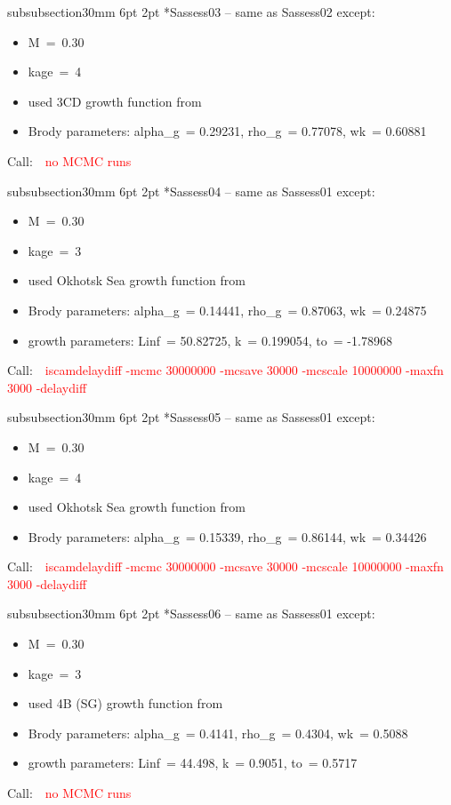 \documentclass[11pt]{book}
\makeatletter
\newcommand{\red}[1]{{\textcolor{red} {#1}}}
\renewcommand{\subsubsection}{\@startsection%
{subsubsection}{3}{0mm}%
{6pt \@plus -0pt \@minus -0pt}{2pt \@plus 0pt}%
{\normalfont\bf}}%
\newcommand\call[1]{
\footnotesize\selectfont\hangindent=0.35in
Call:~~\red{#1}
\normalsize\selectfont}
\makeatother
\begin{document}
\subsubsection*{Sassess03 -- same as Sassess02 except:}
\begin{itemize}[nosep]
  \item M~=~0.30
  \item kage~=~4
  \item used 3CD growth function from \citet{Saunders-etal:1989}
  \item Brody parameters: alpha\_g~= 0.29231, rho\_g~= 0.77078, wk~= 0.60881
\end{itemize}
\call{no MCMC runs}

\subsubsection*{Sassess04 -- same as Sassess01 except:}
\begin{itemize}[nosep]
  \item M~=~0.30
  \item kage~=~3
  \item used Okhotsk Sea growth function from \citet{Janusz-Horbowy:1997}
  \item Brody parameters: alpha\_g~= 0.14441, rho\_g~= 0.87063, wk~= 0.24875
  \item growth parameters: Linf~= 50.82725, k~= 0.199054, to~= -1.78968
\end{itemize}
\call{iscamdelaydiff -mcmc 30000000 -mcsave 30000 -mcscale 10000000 -maxfn 3000 -delaydiff}

\subsubsection*{Sassess05 -- same as Sassess01 except:}
\begin{itemize}[nosep]
  \item M~=~0.30
  \item kage~=~4
  \item used Okhotsk Sea growth function from \citet{Janusz-Horbowy:1997}
  \item Brody parameters: alpha\_g~= 0.15339, rho\_g~= 0.86144, wk~= 0.34426
\end{itemize}
\call{iscamdelaydiff -mcmc 30000000 -mcsave 30000 -mcscale 10000000 -maxfn 3000 -delaydiff}

\subsubsection*{Sassess06 -- same as Sassess01 except:}
\begin{itemize}[nosep]
  \item M~=~0.30
  \item kage~=~3
  \item used 4B (SG) growth function from \citet{Saunders-etal:1989}
  \item Brody parameters: alpha\_g~= 0.4141, rho\_g~= 0.4304, wk~= 0.5088
  \item growth parameters: Linf~= 44.498, k~= 0.9051, to~= 0.5717
\end{itemize}
\call{no MCMC runs}
\end{document}

